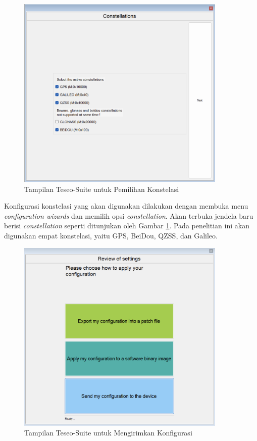  \begin{figure}[H]
	\centering
	\includegraphics[width=10cm]{contents/chapter-3/setting-konstelasi/pilih-konfigurasi.png}
	\caption{Tampilan Teseo-Suite untuk Pemilihan Konstelasi}
	\label{Fig: pilih-konstelasi}
\end{figure}

Konfigurasi konstelasi yang akan digunakan dilakukan dengan membuka menu \textit{configuration wizards} dan memilih opsi \textit{constellation}. Akan terbuka jendela baru berisi \textit{constellation} seperti ditunjukan oleh Gambar \ref{Fig: pilih-konstelasi}. Pada penelitian ini akan digunakan empat konstelasi, yaitu GPS, BeiDou, QZSS, dan Galileo.

\begin{figure}[H]
	\centering
	\includegraphics[width=10cm]{contents/chapter-3/setting-konstelasi/kirim-konfigurasi.png}
	\caption{Tampilan Teseo-Suite untuk Mengirimkan Konfigurasi}
	\label{Fig: kirim-konstelasi}
\end{figure}

